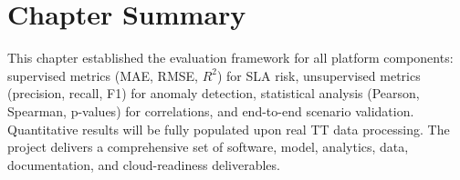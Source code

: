 \section{Chapter Summary}

This chapter established the evaluation framework for all platform components: supervised metrics (MAE, RMSE, $R^2$) for SLA risk, unsupervised metrics (precision, recall, F1) for anomaly detection, statistical analysis (Pearson, Spearman, p-values) for correlations, and end-to-end scenario validation. Quantitative results will be fully populated upon real TT data processing. The project delivers a comprehensive set of software, model, analytics, data, documentation, and cloud-readiness deliverables.
